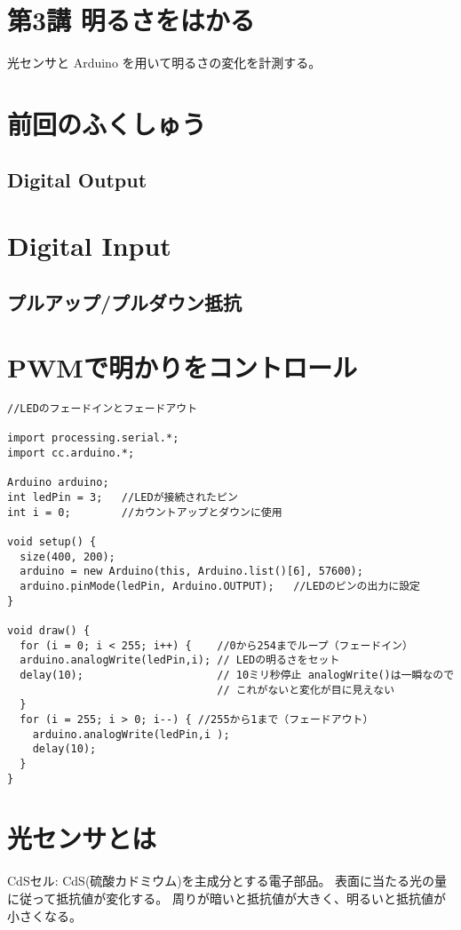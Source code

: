 \documentclass[11pt,a4paper]{jarticle}
\begin{document}
\section*{\LARGE{第3講 明るさをはかる}}
光センサと Arduino を用いて明るさの変化を計測する。

\section{前回のふくしゅう}
\subsection*{Digital Output}

\section{Digital Input}

\subsection*{プルアップ/プルダウン抵抗}


\section{PWMで明かりをコントロール}
\begin{lstlisting}
//LEDのフェードインとフェードアウト

import processing.serial.*;
import cc.arduino.*;
 
Arduino arduino;
int ledPin = 3;   //LEDが接続されたピン
int i = 0;        //カウントアップとダウンに使用
 
void setup() {
  size(400, 200);
  arduino = new Arduino(this, Arduino.list()[6], 57600);
  arduino.pinMode(ledPin, Arduino.OUTPUT);   //LEDのピンの出力に設定
}

void draw() {
  for (i = 0; i < 255; i++) {    //0から254までループ（フェードイン）
  arduino.analogWrite(ledPin,i); // LEDの明るさをセット
  delay(10);                     // 10ミリ秒停止 analogWrite()は一瞬なので
                                 // これがないと変化が目に見えない  
  }
  for (i = 255; i > 0; i--) { //255から1まで（フェードアウト）
    arduino.analogWrite(ledPin,i );
    delay(10);
  }
}
\end{lstlisting}

\section{光センサとは}
CdSセル: CdS(硫酸カドミウム)を主成分とする電子部品。
表面に当たる光の量に従って抵抗値が変化する。
周りが暗いと抵抗値が大きく、明るいと抵抗値が小さくなる。
\end{document}
